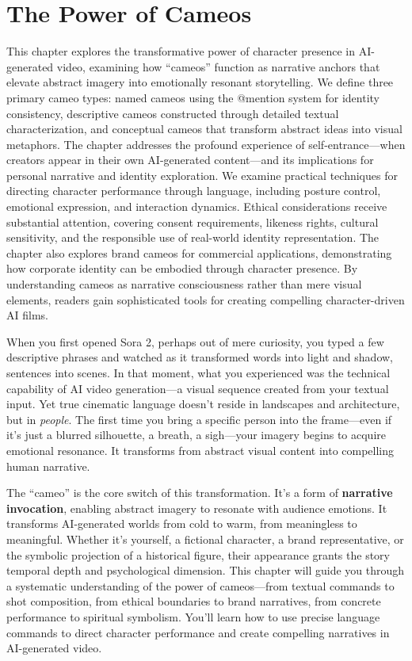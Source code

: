 \chapter{The Power of Cameos}
\label{ch:cameos}

\begin{chapterabstract}
This chapter explores the transformative power of character presence in AI-generated video, examining how ``cameos'' function as narrative anchors that elevate abstract imagery into emotionally resonant storytelling. We define three primary cameo types: named cameos using the @mention system for identity consistency, descriptive cameos constructed through detailed textual characterization, and conceptual cameos that transform abstract ideas into visual metaphors. The chapter addresses the profound experience of self-entrance—when creators appear in their own AI-generated content—and its implications for personal narrative and identity exploration. We examine practical techniques for directing character performance through language, including posture control, emotional expression, and interaction dynamics. Ethical considerations receive substantial attention, covering consent requirements, likeness rights, cultural sensitivity, and the responsible use of real-world identity representation. The chapter also explores brand cameos for commercial applications, demonstrating how corporate identity can be embodied through character presence. By understanding cameos as narrative consciousness rather than mere visual elements, readers gain sophisticated tools for creating compelling character-driven AI films.
\end{chapterabstract}

When you first opened Sora 2, perhaps out of mere curiosity, you typed a few descriptive phrases and watched as it transformed words into light and shadow, sentences into scenes. In that moment, what you experienced was the technical capability of AI video generation—a visual sequence created from your textual input. Yet true cinematic language doesn't reside in landscapes and architecture, but in \textit{people}. The first time you bring a specific person into the frame—even if it's just a blurred silhouette, a breath, a sigh—your imagery begins to acquire emotional resonance. It transforms from abstract visual content into compelling human narrative.

The ``cameo'' is the core switch of this transformation. It's a form of \textbf{narrative invocation}, enabling abstract imagery to resonate with audience emotions. It transforms AI-generated worlds from cold to warm, from meaningless to meaningful. Whether it's yourself, a fictional character, a brand representative, or the symbolic projection of a historical figure, their appearance grants the story temporal depth and psychological dimension. This chapter will guide you through a systematic understanding of the power of cameos—from textual commands to shot composition, from ethical boundaries to brand narratives, from concrete performance to spiritual symbolism. You'll learn how to use precise language commands to direct character performance and create compelling narratives in AI-generated video.

